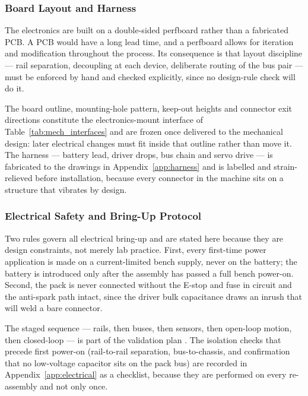 \subsubsection{Board Layout and Harness}
\label{sec:layout}

The electronics are built on a double-sided perfboard rather than a fabricated PCB. A PCB would have a long lead time, and a perfboard allows for iteration and modification throughout the process. Its consequence is that
layout discipline --- rail separation, decoupling at each device, deliberate
routing of the bus pair --- must be enforced by hand and checked explicitly,
since no design-rule check will do it.

The board outline, mounting-hole pattern, keep-out heights and connector exit
directions constitute the electronics-mount interface of
Table~\ref{tab:mech_interfaces} and are frozen once delivered to the mechanical
design: later electrical changes must fit inside that outline rather than move
it. The harness --- battery lead, driver drops, bus chain and servo drive ---
is fabricated to the drawings in Appendix~\ref{app:harness} and is labelled and
strain-relieved before installation, because every connector in the machine sits
on a structure that vibrates by design.

\subsubsection{Electrical Safety and Bring-Up Protocol}
\label{sec:electrical_safety}

Two rules govern all electrical bring-up and are stated here because they are
design constraints, not merely lab practice. First, every first-time power
application is made on a current-limited bench supply, never on the battery; the
battery is introduced only after the assembly has passed a full bench power-on.
Second, the pack is never connected without the E-stop and fuse in circuit and
the anti-spark path intact, since the driver bulk capacitance draws an inrush
that will weld a bare connector.

The staged sequence --- rails, then buses, then sensors, then open-loop motion,
then closed-loop --- is part of the validation plan
. The isolation checks that precede first power-on
(rail-to-rail separation, bus-to-chassis, and confirmation that no low-voltage
capacitor sits on the pack bus) are recorded in Appendix~\ref{app:electrical}
as a checklist, because they are performed on every re-assembly and not only
once.

